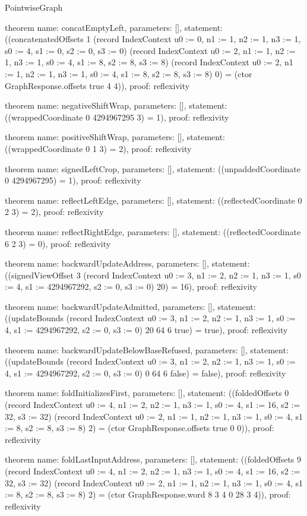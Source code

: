 \begin{lexlean}{PointwiseGraph}
\begin{semanticmodule}
theorem{
  name: concatEmptyLeft,
  parameters: [],
  statement: ((concatenatedOffsets 1 (record IndexContext {u0 := 0, n1 := 1, n2 := 1, n3 := 1, s0 := 4, s1 := 0, s2 := 0, s3 := 0}) (record IndexContext {u0 := 2, n1 := 1, n2 := 1, n3 := 1, s0 := 4, s1 := 8, s2 := 8, s3 := 8}) (record IndexContext {u0 := 2, n1 := 1, n2 := 1, n3 := 1, s0 := 4, s1 := 8, s2 := 8, s3 := 8}) 0) = (ctor GraphResponse.offsets true 4 4)),
  proof: reflexivity{}
}

theorem{
  name: negativeShiftWrap,
  parameters: [],
  statement: ((wrappedCoordinate 0 4294967295 3) = 1),
  proof: reflexivity{}
}

theorem{
  name: positiveShiftWrap,
  parameters: [],
  statement: ((wrappedCoordinate 0 1 3) = 2),
  proof: reflexivity{}
}

theorem{
  name: signedLeftCrop,
  parameters: [],
  statement: ((unpaddedCoordinate 0 4294967295) = 1),
  proof: reflexivity{}
}

theorem{
  name: reflectLeftEdge,
  parameters: [],
  statement: ((reflectedCoordinate 0 2 3) = 2),
  proof: reflexivity{}
}

theorem{
  name: reflectRightEdge,
  parameters: [],
  statement: ((reflectedCoordinate 6 2 3) = 0),
  proof: reflexivity{}
}

theorem{
  name: backwardUpdateAddress,
  parameters: [],
  statement: ((signedViewOffset 3 (record IndexContext {u0 := 3, n1 := 2, n2 := 1, n3 := 1, s0 := 4, s1 := 4294967292, s2 := 0, s3 := 0}) 20) = 16),
  proof: reflexivity{}
}

theorem{
  name: backwardUpdateAdmitted,
  parameters: [],
  statement: ((updateBounds (record IndexContext {u0 := 3, n1 := 2, n2 := 1, n3 := 1, s0 := 4, s1 := 4294967292, s2 := 0, s3 := 0}) 20 64 6 true) = true),
  proof: reflexivity{}
}

theorem{
  name: backwardUpdateBelowBaseRefused,
  parameters: [],
  statement: ((updateBounds (record IndexContext {u0 := 3, n1 := 2, n2 := 1, n3 := 1, s0 := 4, s1 := 4294967292, s2 := 0, s3 := 0}) 0 64 6 false) = false),
  proof: reflexivity{}
}

theorem{
  name: foldInitializesFirst,
  parameters: [],
  statement: ((foldedOffsets 0 (record IndexContext {u0 := 4, n1 := 2, n2 := 1, n3 := 1, s0 := 4, s1 := 16, s2 := 32, s3 := 32}) (record IndexContext {u0 := 2, n1 := 1, n2 := 1, n3 := 1, s0 := 4, s1 := 8, s2 := 8, s3 := 8}) 2) = (ctor GraphResponse.offsets true 0 0)),
  proof: reflexivity{}
}

theorem{
  name: foldLastInputAddress,
  parameters: [],
  statement: ((foldedOffsets 9 (record IndexContext {u0 := 4, n1 := 2, n2 := 1, n3 := 1, s0 := 4, s1 := 16, s2 := 32, s3 := 32}) (record IndexContext {u0 := 2, n1 := 1, n2 := 1, n3 := 1, s0 := 4, s1 := 8, s2 := 8, s3 := 8}) 2) = (ctor GraphResponse.word 8 3 4 0 28 3 4)),
  proof: reflexivity{}
}


\end{semanticmodule}
\end{lexlean}
